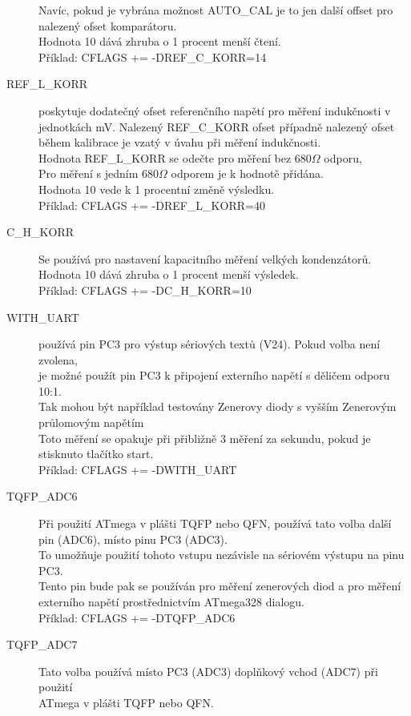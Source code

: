 \begin{description}
Navíc, pokud je vybrána možnost AUTO\_CAL je to jen další offset pro
nalezený ofset komparátoru.\\
Hodnota 10 dává zhruba o 1 procent menší čtení.\\
Příklad: CFLAGS += -DREF\_C\_KORR=14
\vspace{-0,3cm}
  \item[REF\_L\_KORR] poskytuje dodatečný ofset referenčního napětí pro měření indukčnosti
v jednotkách mV. Nalezený REF\_C\_KORR ofset případně nalezený ofset během kalibrace
je vzatý v úvahu při měření indukčnosti.\\
Hodnota REF\_L\_KORR se odečte pro měření bez \(680\Omega\) odporu,\\ Pro měření s jedním \(680\Omega\) odporem je  k hodnotě přidána.\\
Hodnota 10 vede k 1 procentní změně výsledku.\\
Příklad: CFLAGS += -DREF\_L\_KORR=40
\vspace{-0,3cm}
  \item[C\_H\_KORR] Se používá pro nastavení kapacitního měření velkých kondenzátorů.\\
Hodnota 10 dává zhruba o 1 procent menší výsledek.\\
Příklad: CFLAGS += -DC\_H\_KORR=10
\vspace{-0,3cm}
  \item[WITH\_UART] používá pin PC3 pro výstup sériových textů (V24). Pokud volba není zvolena,\\
 je možné použít pin PC3 k připojení externího napětí s děličem odporu 10:1.\\ Tak mohou být například testovány Zenerovy diody s vyšším Zenerovým průlomovým napětím\\
Toto měření se opakuje při přibližně 3 měření za sekundu, pokud je stisknuto tlačítko start.\\
Příklad: CFLAGS += -DWITH\_UART
\vspace{-0,3cm}
  \item[TQFP\_ADC6] Při použití ATmega v plášti TQFP nebo QFN, používá tato volba další pin (ADC6), místo pinu PC3 (ADC3).\\
To umožňuje použití tohoto vstupu nezávisle na sériovém výstupu na pinu PC3.\\Tento pin bude
pak se používán pro měření zenerových diod a pro měření externího napětí prostřednictvím  ATmega328 dialogu.\\
Příklad: CFLAGS += -DTQFP\_ADC6
\vspace{-0,3cm}
  \item[TQFP\_ADC7] Tato volba používá místo PC3 (ADC3) doplňkový vchod (ADC7) při použití\\ ATmega v plášti TQFP nebo QFN.\\

\end{description}
